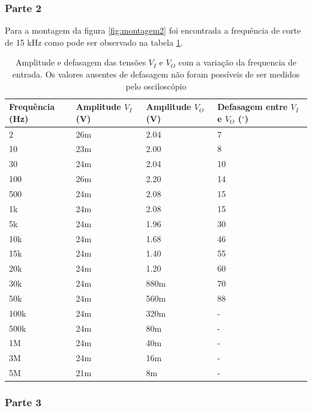 \documentclass{abntex2}
\begin{document}
\subsubsection{Parte 2}

Para a montagem da figura \ref{fig:montagem2} foi encontrada a frequência de corte de 15 kHz como pode ser observado na tabela \ref{tab:exp2}.

\begin{table}[h!]
  \centering
  \begin{tabular}[width = 0.8\textwidth]{|l|l|l|l|}
    \hline
    Frequência (Hz) & Amplitude $V_I$ (V) & Amplitude $V_O$ (V) & Defasagem entre $V_I$ e $V_O$ ($^{\circ}$) \\
    \hline
    2 & 26m & 2.04 & 7 \\
    \hline
    10 &  23m & 2.00 & 8 \\
    \hline
    30 &  24m & 2.04 & 10 \\
    \hline
    100 & 26m & 2.20 & 14 \\
    \hline
    500 & 24m & 2.08 & 15 \\
    \hline
    1k &  24m & 2.08 & 15 \\
    \hline
    5k &  24m & 1.96 & 30 \\
    \hline
    10k & 24m & 1.68 & 46 \\
    \hline
    15k & 24m & 1.40 & 55 \\
    \hline
    20k & 24m & 1.20 & 60 \\
    \hline
    30k & 24m & 880m & 70 \\
    \hline
    50k & 24m & 560m & 88 \\
    \hline
    100k & 24m & 320m & - \\
    \hline
    500k & 24m & 80m &  - \\
    \hline
    1M &  24m & 40m  & - \\
    \hline
    3M &  24m & 16m  & - \\
    \hline
    5M &  21m & 8m  &  - \\
    \hline
  \end{tabular}
  \caption{Amplitude e defasagem das tensões $V_I$ e $V_O$ com a variação da frequencia de entrada. Os valores ausentes de defasagem não foram possíveis de ser medidos pelo osciloscópio}
  \label{tab:exp2}
\end{table}

\subsubsection{Parte 3}
\end{document}
